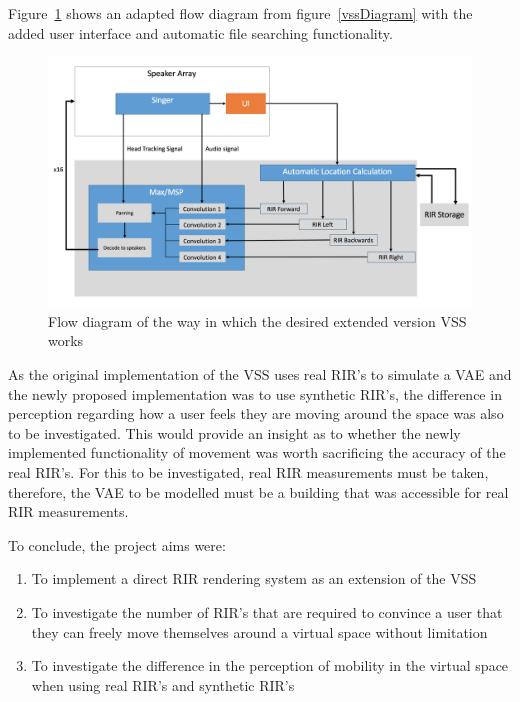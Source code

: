 \documentclass[../../main.tex]{subfiles}
\begin{document}
		Figure~\ref{vssExtention} shows an adapted flow diagram from figure~\ref{vssDiagram} with the added user interface and automatic file searching functionality.

		\begin{figure}[H]
			\centerline{\includegraphics[scale = 0.45]{Sections/Background/images/vssExtention.png}}
			\caption{Flow diagram of the way in which the desired extended version VSS works}
			\label{vssExtention}
		\end{figure}

		As the original implementation of the \ac{VSS} uses real \ac{RIR}'s to simulate a \ac{VAE} and the newly proposed implementation was to use synthetic \ac{RIR}'s, the difference in perception regarding how a user feels they are moving around the space was also to be investigated. This would provide an insight as to whether the newly implemented functionality of movement was worth sacrificing the accuracy of the real \ac{RIR}'s. For this to be investigated, real \ac{RIR} measurements must be taken, therefore, the \ac{VAE} to be modelled must be a building that was accessible for real \ac{RIR} measurements.

		To conclude, the project aims were:

		\begin{enumerate}
			\item To implement a direct \ac{RIR} rendering system as an extension of the \ac{VSS}

			\item To investigate the number of \ac{RIR}'s that are required to convince a user that they can freely move themselves around a virtual space without limitation

			\item To investigate the difference in the perception of mobility in the virtual space when using real \ac{RIR}'s and synthetic \ac{RIR}'s
		\end{enumerate}
\end{document}
